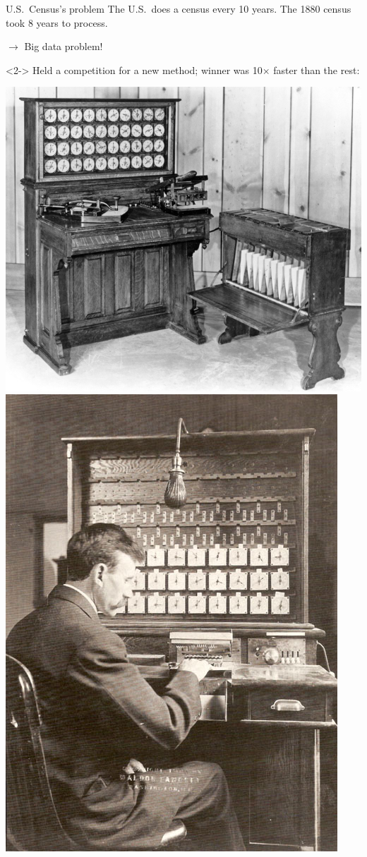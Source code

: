 \documentclass[aspectratio=169]{beamer}
\begin{document}
\begin{frame}{U.S.\ Census's problem}
\large
\vspace{0.35 cm}
The U.S.\ does a census every 10 years. The 1880 census took 8 years to process.
\begin{center}
$\longrightarrow$ Big data problem!
\end{center}

\vspace{0.15 cm}
\begin{uncoverenv}<2->
Held a competition for a new method; winner was 10$\times$ faster than the rest:

\begin{center}
\includegraphics[height=5.3 cm]{hollerith.jpg}\hspace{1 cm}\includegraphics[height=5.3 cm]{1908_Hollerith_Machine.jpg}
\end{center}
\end{uncoverenv}
\end{frame}
\end{document}
